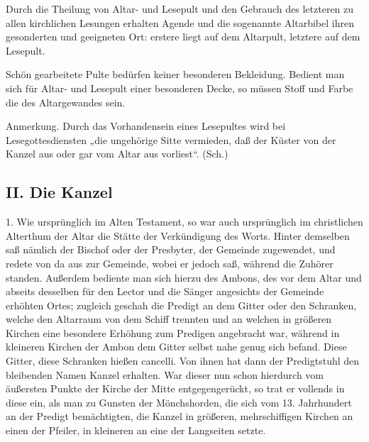 Durch die Theilung von Altar- und Lesepult und den Gebrauch des letzteren zu allen kirchlichen Lesungen erhalten Agende und die sogenannte Altarbibel ihren gesonderten und geeigneten Ort: erstere liegt auf dem Altarpult, letztere auf dem Lesepult.

Schön gearbeitete Pulte bedürfen keiner besonderen Bekleidung. Bedient man sich für Altar- und Lesepult einer besonderen Decke, so müssen Stoff und Farbe die des Altargewandes sein.

Anmerkung. Durch das Vorhandensein eines Lesepultes wird bei Lesegottesdiensten „die ungehörige Sitte vermieden, daß der Küster von der Kanzel aus oder gar vom Altar aus vorliest“. (Sch.)

\subsection{II. Die Kanzel}


1. Wie ursprünglich im Alten Testament, so war auch ursprünglich im christlichen Alterthum der Altar die Stätte der Verkündigung des Worts. Hinter demselben saß nämlich der Bischof oder der Presbyter, der Gemeinde zugewendet, und redete von da aus zur Gemeinde, wobei er jedoch saß, während die Zuhörer standen. Außerdem bediente man sich hierzu des Ambons, des vor dem Altar und abseits desselben für den Lector und die Sänger angesichts der Gemeinde erhöhten Ortes; zugleich geschah die Predigt an dem Gitter oder
den Schranken, welche den Altarraum von dem Schiff trennten und an welchen in größeren Kirchen eine besondere Erhöhung zum Predigen angebracht war, während in kleineren Kirchen der Ambon dem Gitter selbst nahe genug sich befand. Diese Gitter, diese Schranken hießen cancelli. Von ihnen hat dann der Predigtstuhl den bleibenden Namen Kanzel erhalten. War dieser nun schon hierdurch vom äußersten Punkte der Kirche der Mitte entgegengerückt, so trat er vollends in diese ein, als man zu Gunsten der Mönchshorden, die sich vom 13. Jahrhundert an der Predigt bemächtigten, die Kanzel in größeren, mehrschiffigen Kirchen an einen der Pfeiler, in kleineren an eine der Langseiten setzte.

